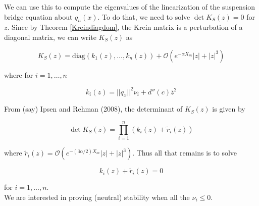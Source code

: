\documentclass[12pt]{article}
\begin{document}
We can use this to compute the eigenvalues of the linearization of the suspension bridge equation about $q_n(x)$. To do that, we need to solve $\det K_S(z) = 0$ for $z$. Since by Theorem \ref{Kreindiagdom}, the Krein matrix is a perturbation of a diagonal matrix, we can write $K_S(z)$ as 

\begin{equation}
K_S(z) = \text{diag}(k_1(z), \dots, k_n(z)) + \mathcal{O}(e^{-\alpha X_m}|z| + |z|^3)
\end{equation}

where for $i = 1, \dots, n$

\begin{equation}
k_i(z) = ||q_x||^2 \nu_i + d''(c) \overline{z}^2
\end{equation}

From (say) Ipsen and Rehman (2008), the determinant of $K_S(z)$ is given by

\begin{equation}\label{detK}
\det K_S(z) = \prod_{i = 1}^n (k_i(z) + \tilde{r}_i(z))
\end{equation}

where $\tilde{r}_i(z) = \mathcal{O}(e^{-(3 \alpha/2) X_m}|z| + |z|^3)$. Thus all that remains is to solve

\[
k_i(z) + \tilde{r}_i(z) = 0
\]

for $i = 1, \dots, n$.\\

We are interested in proving (neutral) stability when all the $\nu_i \leq 0$. 
\end{document}
